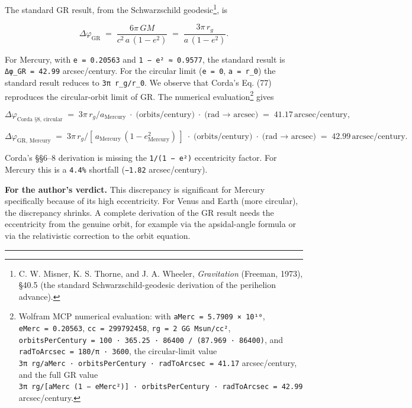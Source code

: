 \documentclass[
  11pt,
]{article}
\begin{document}
The standard GR result, from the Schwarzschild geodesic\footnote{C. W.
  Misner, K. S. Thorne, and J. A. Wheeler, \emph{Gravitation} (Freeman,
  1973), §40.5 (the standard Schwarzschild-geodesic derivation of the
  perihelion advance).}, is

\[
\Delta\varphi_{\text{GR}}
\;=\; \frac{6\pi\,GM}{c^{2}\,a\,(1-e^{2})}
\;=\; \frac{3\pi\,r_{g}}{a\,(1-e^{2})}. \tag{R6}
\]

For Mercury, with \texttt{e\ =\ 0.20563} and
\texttt{1\ −\ e²\ ≈\ 0.9577}, the standard result is
\texttt{Δφ\_GR\ =\ 42.99} arcsec/century. For the circular limit
(\texttt{e\ =\ 0}, \texttt{a\ =\ r\_0}) the standard result reduces to
\texttt{3π\ r\_g/r\_0}. We observe that Corda's Eq. (77) reproduces the
circular-orbit limit of GR. The numerical evaluation\footnote{Wolfram
  MCP numerical evaluation: with \texttt{aMerc\ =\ 5.7909\ ×\ 10¹⁰},
  \texttt{eMerc\ =\ 0.20563}, \texttt{cc\ =\ 299792458},
  \texttt{rg\ =\ 2\ GG\ Msun/cc²},
  \texttt{orbitsPerCentury\ =\ 100\ ·\ 365.25\ ·\ 86400\ /\ (87.969\ ·\ 86400)},
  and \texttt{radToArcsec\ =\ 180/π\ ·\ 3600}, the circular-limit value
  \texttt{3π\ rg/aMerc\ ·\ orbitsPerCentury\ ·\ radToArcsec\ =\ 41.17}
  arcsec/century, and the full GR value
  \texttt{3π\ rg/{[}aMerc\ (1\ −\ eMerc²){]}\ ·\ orbitsPerCentury\ ·\ radToArcsec\ =\ 42.99}
  arcsec/century.} gives

\[
\Delta\varphi_{\text{Corda §8, circular}}
\;=\; 3\pi\,r_{g}/a_{\text{Mercury}}\;\cdot\;\text{(orbits/century)}\;\cdot\;\text{(rad → arcsec)}
\;=\; 41.17\,\text{arcsec/century}, \tag{R7}
\]

\[
\Delta\varphi_{\text{GR, Mercury}}
\;=\; 3\pi\,r_{g}/[\,a_{\text{Mercury}}\,(1 - e_{\text{Mercury}}^{2})\,]\;\cdot\;\text{(orbits/century)}\;\cdot\;\text{(rad → arcsec)}
\;=\; 42.99\,\text{arcsec/century}. \tag{R8}
\]

Corda's §§6--8 derivation is missing the \texttt{1/(1\ −\ e²)}
eccentricity factor. For Mercury this is a \texttt{4.4\%} shortfall
(\texttt{−1.82} arcsec/century).

\textbf{For the author's verdict.} This discrepancy is significant for
Mercury specifically because of its high eccentricity. For Venus and
Earth (more circular), the discrepancy shrinks. A complete derivation of
the GR result needs the eccentricity from the genuine orbit, for example
via the apsidal-angle formula or via the relativistic correction to the
orbit equation.

\begin{center}\rule{0.5\linewidth}{0.5pt}\end{center}
\end{document}
